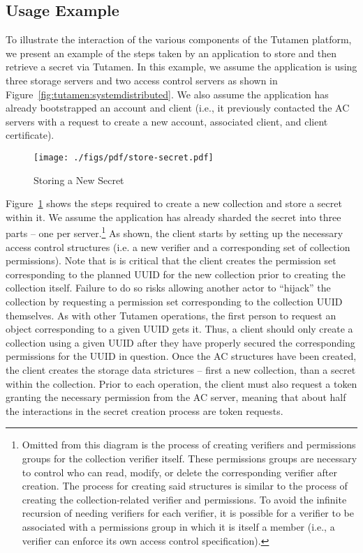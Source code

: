\subsection{Usage Example}

To illustrate the interaction of the various components of the Tutamen
platform, we present an example of the steps taken by an application
to store and then retrieve a secret via Tutamen. In this example, we
assume the application is using three storage servers and two access
control servers as shown in
Figure~\ref{fig:tutamen:systemdistributed}. We also assume the
application has already bootstrapped an account and client (i.e., it
previously contacted the AC servers with a request to create a new
account, associated client, and client certificate).

\begin{figure}[th]
  \centering
  \texttt{[image: ./figs/pdf/store-secret.pdf]}
  \caption{Storing a New Secret}
  \label{fig:tutamen:storesecret}
\end{figure}

Figure~\ref{fig:tutamen:storesecret} shows the steps required to
create a new collection and store a secret within it. We assume the
application has already sharded the secret into three parts -- one per
server.\footnote{Omitted from this diagram is the process of creating
  verifiers and permissions groups for the collection verifier
  itself. These permissions groups are necessary to control who can
  read, modify, or delete the corresponding verifier after
  creation. The process for creating said structures is similar to the
  process of creating the collection-related verifier and
  permissions. To avoid the infinite recursion of needing verifiers
  for each verifier, it is possible for a verifier to be associated
  with a permissions group in which it is itself a member (i.e., a
  verifier can enforce its own access control specification).} As
shown, the client starts by setting up the necessary access control
structures (i.e. a new verifier and a corresponding set of collection
permissions). Note that is is critical that the client creates the
permission set corresponding to the planned UUID for the new
collection prior to creating the collection itself. Failure to do so
risks allowing another actor to ``hijack'' the collection by
requesting a permission set corresponding to the collection UUID
themselves. As with other Tutamen operations, the first person to
request an object corresponding to a given UUID gets it. Thus, a
client should only create a collection using a given UUID after they
have properly secured the corresponding permissions for the UUID in
question. Once the AC structures have been created, the client creates
the storage data strictures -- first a new collection, than a secret
within the collection. Prior to each operation, the client must also
request a token granting the necessary permission from the AC server,
meaning that about half the interactions in the secret creation
process are token requests.

